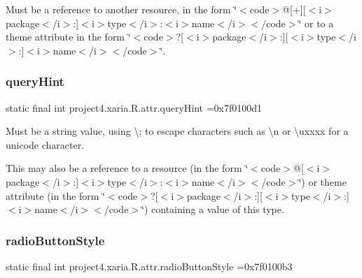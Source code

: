 Must be a reference to another resource, in the form \char`\"{}$<$code$>$@\mbox{[}+\mbox{]}\mbox{[}$<$i$>$package$<$/i$>$\+:\mbox{]}$<$i$>$type$<$/i$>$\+:$<$i$>$name$<$/i$>$$<$/code$>$\char`\"{} or to a theme attribute in the form \char`\"{}$<$code$>$?\mbox{[}$<$i$>$package$<$/i$>$\+:\mbox{]}\mbox{[}$<$i$>$type$<$/i$>$\+:\mbox{]}$<$i$>$name$<$/i$>$$<$/code$>$\char`\"{}. \mbox{\label{classproject4_1_1xaria_1_1R_1_1attr_ab087e93a83625f6b1721962d4c375609}} 
\subsubsection{\texorpdfstring{query\+Hint}{queryHint}}
{\footnotesize\ttfamily static final int project4.\+xaria.\+R.\+attr.\+query\+Hint =0x7f0100d1\hspace{0.3cm}{\ttfamily [static]}}

Must be a string value, using \textquotesingle{}\textbackslash{};\textquotesingle{} to escape characters such as \textquotesingle{}\textbackslash{}n\textquotesingle{} or \textquotesingle{}\textbackslash{}uxxxx\textquotesingle{} for a unicode character. 

This may also be a reference to a resource (in the form \char`\"{}$<$code$>$@\mbox{[}$<$i$>$package$<$/i$>$\+:\mbox{]}$<$i$>$type$<$/i$>$\+:$<$i$>$name$<$/i$>$$<$/code$>$\char`\"{}) or theme attribute (in the form \char`\"{}$<$code$>$?\mbox{[}$<$i$>$package$<$/i$>$\+:\mbox{]}\mbox{[}$<$i$>$type$<$/i$>$\+:\mbox{]}$<$i$>$name$<$/i$>$$<$/code$>$\char`\"{}) containing a value of this type. \mbox{\label{classproject4_1_1xaria_1_1R_1_1attr_a34339d90503bd8a083f82ef72df0c319}} 
\subsubsection{\texorpdfstring{radio\+Button\+Style}{radioButtonStyle}}
{\footnotesize\ttfamily static final int project4.\+xaria.\+R.\+attr.\+radio\+Button\+Style =0x7f0100b3\hspace{0.3cm}{\ttfamily [static]}}

